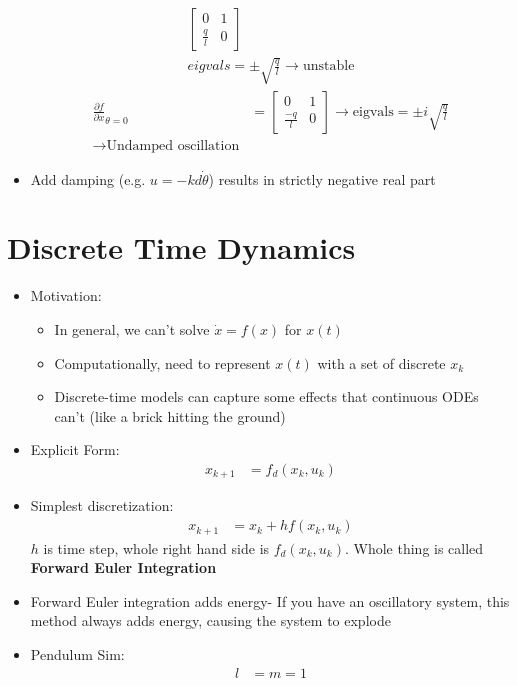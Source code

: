 \documentclass[11pt]{article}
\begin{document}
\begin{itemize}
\begin{align*}
\begin{bmatrix}
            0 & 1 \\
            \frac{q}{l} & 0
        \end{bmatrix}
        \\
        eigvals = \pm \sqrt{\frac{q}{l}}\rightarrow\text{unstable}
    \end{align*}
    \begin{align*}
        \frac{\partial f}{\partial x}_{\theta = 0} &= \begin{bmatrix}
            0 & 1 \\
            \frac{-q}{l} & 0
        \end{bmatrix}
        \rightarrow \text{eigvals} = \pm i\sqrt{\frac{q}{l}}
        \\
        \rightarrow\text{Undamped oscillation}
    \end{align*}
    \item Add damping (e.g. $u=-kd\dot{\theta}$) results in strictly negative real part
\end{itemize}

\section{Discrete Time Dynamics}
\begin{itemize}
    \item Motivation:
    \begin{itemize}
        \item In general, we can't solve $\dot{x}=f(x)$ for $x(t)$
        \item Computationally, need to represent $x(t)$ with a set of discrete $x_k$
        \item Discrete-time models can capture some effects that continuous ODEs can't (like a brick hitting the ground)
    \end{itemize}
    \item Explicit Form:
    \begin{align*}
        x_{k+1} &= f_d(x_k,u_k)
    \end{align*}
    \item Simplest discretization:
    \begin{align*}
        x_{k+1} &= x_k + hf(x_k,u_k)
    \end{align*}
    $h$ is time step, whole right hand side is $f_d(x_k,u_k)$. Whole thing is called \textbf{Forward Euler Integration}
    \item Forward Euler integration adds energy- If you have an oscillatory system, this method always adds energy, causing the system to explode
    \item Pendulum Sim:
    \begin{align*}
        l &= m = 1 
    \end{align*}
\end{itemize}
\end{document}
